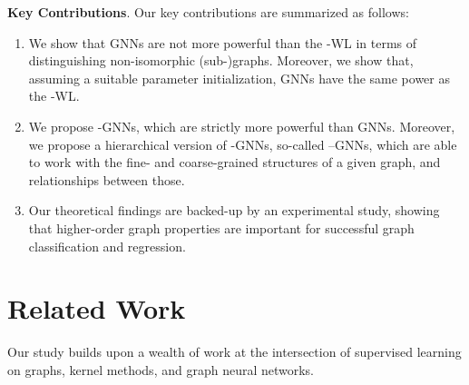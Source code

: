\documentclass[letterpaper]{article}
\theoremstyle{definition}
\newcommand{\xhdr}[1]{{\noindent\bfseries #1}.}
\begin{document}
\xhdr{Key Contributions}
Our key contributions are summarized as follows:
\begin{enumerate}
	\item We show that GNNs are not more powerful than the -WL in terms of distinguishing non-isomorphic (sub-)graphs. Moreover, we show that, assuming a suitable parameter initialization, GNNs have the same power as the -WL.
	\item We propose -GNNs, which are strictly more powerful than GNNs. Moreover, we propose a hierarchical version of -GNNs, so-called --GNNs, which are able to work with the fine- and coarse-grained structures of a given graph, and relationships between those. 
	\item Our theoretical findings are backed-up by an experimental study, showing that higher-order graph properties are important for successful graph classification and regression.
\end{enumerate}

\section{Related Work}
Our study builds upon a wealth of work at the intersection of supervised learning on graphs, kernel methods, and graph neural networks. 
\end{document}

